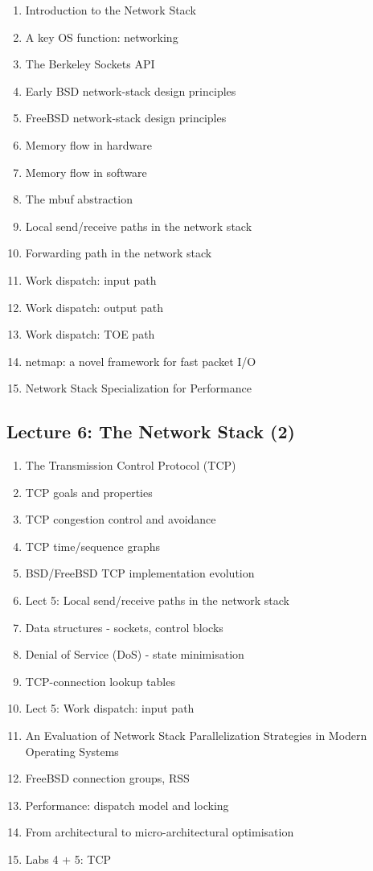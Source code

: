 \documentclass[a4paper,10pt]{article}
\begin{document}
\begin{enumerate}
  \item Introduction to the Network Stack
  \item A key OS function: networking
  \item The Berkeley Sockets API
  \item Early BSD network-stack design principles
  \item FreeBSD network-stack design principles
  \item Memory flow in hardware
  \item Memory flow in software
  \item The mbuf abstraction
  \item Local send/receive paths in the network stack
  \item Forwarding path in the network stack
  \item Work dispatch: input path
  \item Work dispatch: output path
  \item Work dispatch: TOE path
  \item netmap: a novel framework for fast packet I/O
  \item Network Stack Specialization for Performance
\end{enumerate}

\subsection*{Lecture 6: The Network Stack (2)}

\begin{enumerate}
  \item The Transmission Control Protocol (TCP)
  \item TCP goals and properties
  \item TCP congestion control and avoidance
  \item TCP time/sequence graphs
  \item BSD/FreeBSD TCP implementation evolution
  \item Lect 5: Local send/receive paths in the network stack
  \item Data structures - sockets, control blocks
  \item Denial of Service (DoS) - state minimisation
  \item TCP-connection lookup tables
  \item Lect 5: Work dispatch: input path
  \item An Evaluation of Network Stack Parallelization Strategies in Modern
    Operating Systems
  \item FreeBSD connection groups, RSS
  \item Performance: dispatch model and locking
  \item From architectural to micro-architectural optimisation
  \item Labs 4 + 5: TCP
\end{enumerate}
\end{document}
